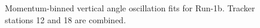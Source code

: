 \begin{figure}[]
\caption{Momentum-binned vertical angle oscillation fits for Run-1b. Tracker stations 12 and 18 are combined.}
\label{fig:Run1bMomBinnedFits}
\end{figure} 
\clearpage

